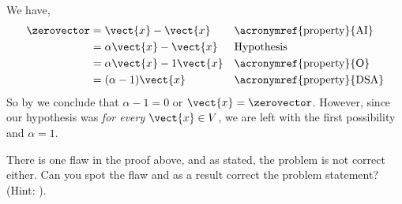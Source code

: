 We have,
%
\begin{align*}
\zerovector
&=\vect{x}-\vect{x}&&\text{\acronymref{property}{AI}}\\
&=\alpha\vect{x}-\vect{x}&&\text{Hypothesis}\\
&=\alpha\vect{x}-1\vect{x}&&\text{\acronymref{property}{O}}\\
&=(\alpha-1)\vect{x}&&\text{\acronymref{property}{DSA}}
\end{align*}
%
So by  we conclude that $\alpha-1=0$ or $\vect{x}=\zerovector$.  However, since our hypothesis was \emph{for every} $\vect{x}\in V$, we are left with the first possibility and $\alpha=1$.\par
%
There is one flaw in the proof above, and as stated, the problem is not correct either.  Can you spot the flaw and as a result correct the problem statement?  (Hint: ).